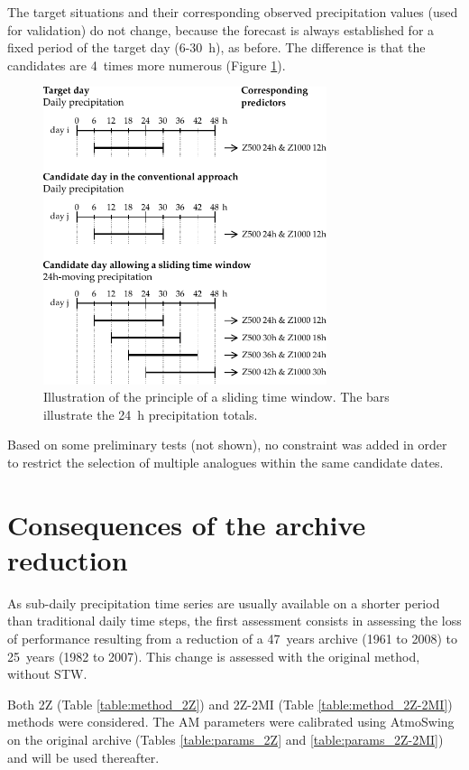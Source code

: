 \documentclass[hess]{copernicus}
\begin{document}
The target situations and their corresponding observed precipitation values (used for validation) do not change, because the forecast is always established for a fixed period of the target day (6-30~h), as before. The difference is that the candidates are 4~times more numerous (Figure \ref{fig:principle}).

\begin{figure}[htb]
	\begin{center}
		\includegraphics[width=8.3cm]{figures/illustration_moving_window.pdf}
	\end{center}
	\caption{Illustration of the principle of a sliding time window. The bars illustrate the 24~h precipitation totals.}
	\label{fig:principle}
\end{figure}

Based on some preliminary tests (not shown), no constraint was added in order to restrict the selection of multiple analogues within the same candidate dates.


\section{Consequences of the archive reduction}

As sub-daily precipitation time series are usually available on a shorter period than traditional daily time steps, the first assessment consists in assessing the loss of performance resulting from a reduction of a 47~years archive (1961 to 2008) to 25~years (1982 to 2007). This change is assessed with the original method, without STW.

Both 2Z (Table \ref{table:method_2Z}) and 2Z-2MI (Table \ref{table:method_2Z-2MI}) methods were considered. The AM parameters were calibrated using AtmoSwing \citep{Horton2016} on the original archive (Tables \ref{table:params_2Z} and \ref{table:params_2Z-2MI}) and will be used thereafter.
\end{document}
